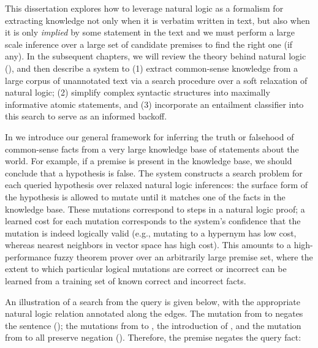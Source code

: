 This dissertation explores how to leverage natural logic as a formalism for
  extracting knowledge not only when it is verbatim written in text, but also when
  it is only \textit{implied} by some statement in the text and we must perform
  a large scale inference over a large set of candidate premises to find the right one
  (if any).
In the subsequent chapters, we will review the theory behind natural logic
  (), and then describe a system to
  (1) extract common-sense knowledge from a large corpus of unannotated text via 
    a search procedure over a soft relaxation of natural logic;
  (2) simplify complex syntactic structures into maximally informative atomic
    statements, and
  (3) incorporate an entailment classifier into this search to serve as an
    informed backoff.


%
%

In  we introduce our general framework for inferring the truth or 
  falsehood of common-sense facts from a very large knowledge base 
  of statements about the world.
For example, if a premise  is present in the knowledge 
  base, we should conclude that a hypothesis  is false.
The system constructs a search problem for each queried hypothesis over relaxed 
  natural logic inferences: the surface form of the hypothesis is allowed to mutate 
  until it matches one of the facts in the knowledge base.
These mutations correspond to steps in a natural logic proof; a learned cost for each 
  mutation corresponds to the system's confidence that the mutation is indeed 
  logically valid (e.g., mutating to a hypernym has low cost, whereas 
  nearest neighbors in vector space has high cost).
This amounts to a high-performance fuzzy theorem prover over an arbitrarily 
  large premise set, where the extent to which particular logical mutations
  are correct or incorrect can be learned from a training set of known correct
  and incorrect facts.


An illustration of a search from the query  
  is given below, with the appropriate natural logic relation annotated 
  along the edges.
The mutation from  to  negates the sentence (\negate); the mutations
  from  to , the introduction of , and the mutation from
   to  all preserve negation (\reverse).
Therefore, the premise negates the query fact:


\vspace{1cm}
\begin{center}
\teaserSearch
\end{center}
\vspace{1cm}


